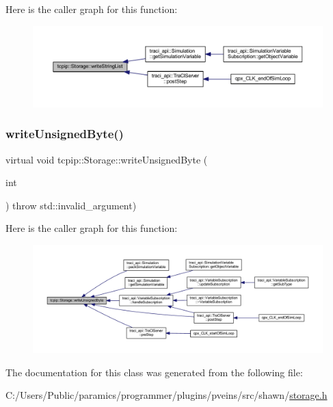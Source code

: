 Here is the caller graph for this function\+:\nopagebreak
\begin{figure}[H]
\begin{center}
\leavevmode
\includegraphics[width=350pt]{classtcpip_1_1_storage_ac1d5d12f930b3884f3265508f2b43901_icgraph}
\end{center}
\end{figure}
\mbox{\label{classtcpip_1_1_storage_a5a42840a57331704c2fdc30e3d1d2a54}} 
\subsubsection{\texorpdfstring{write\+Unsigned\+Byte()}{writeUnsignedByte()}}
{\footnotesize\ttfamily virtual void tcpip\+::\+Storage\+::write\+Unsigned\+Byte (\begin{DoxyParamCaption}\item[{int}]{ }\end{DoxyParamCaption}) throw  std\+::invalid\+\_\+argument) \hspace{0.3cm}{\ttfamily [virtual]}}

Here is the caller graph for this function\+:\nopagebreak
\begin{figure}[H]
\begin{center}
\leavevmode
\includegraphics[width=350pt]{classtcpip_1_1_storage_a5a42840a57331704c2fdc30e3d1d2a54_icgraph}
\end{center}
\end{figure}


The documentation for this class was generated from the following file\+:\begin{DoxyCompactItemize}
\item 
C\+:/\+Users/\+Public/paramics/programmer/plugins/pveins/src/shawn/\hyperlink{storage_8h}{storage.\+h}\end{DoxyCompactItemize}
